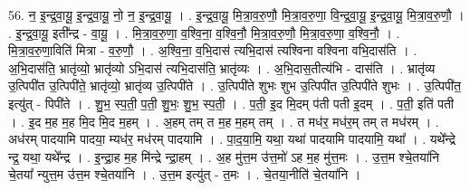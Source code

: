 \documentclass[17pt]{extarticle}
\begin{document}
56. न॒ इ॒न्द्र॒वा॒यू॒ इ॒न्द्र॒वा॒यू॒ नो॒ न॒ इ॒न्द्र॒वा॒यू॒ । . इ॒न्द्र॒वा॒यू॒ मि॒त्रा॒व॒रु॒णौ॒ मि॒त्रा॒व॒रु॒णा॒ वि॒न्द्र॒वा॒॒यू॒ इ॒न्द्र॒वा॒यू॒ मि॒त्रा॒व॒रु॒णौ॒  । . इ॒न्द्र॒वा॒यू॒ इती᳚न्द्र - वा॒यू॒ । . मि॒त्रा॒व॒रु॒णा॒ व॒श्वि॒ना॒ व॒श्वि॒नौ॒ मि॒त्रा॒व॒रु॒णौ॒ मि॒त्रा॒व॒रु॒णा॒ व॒श्वि॒नौ॒ । . मि॒त्रा॒व॒रु॒णा॒विति॑ मित्रा - व॒रु॒णौ॒ । . अ॒श्वि॒ना॒ व॒भि॒दास॑ त्यभि॒दास॑ त्यश्विना वश्विना वभि॒दास॑ति । . अ॒भि॒दास॑ति॒ भ्रातृ॑व्यो॒ भ्रातृ॑व्यो ऽभि॒दास॑ त्यभि॒दास॑ति॒ भ्रातृ॑व्यः । . अ॒भि॒दास॒तीत्य॑भि - दास॑ति । . भ्रातृ॑व्य उ॒त्पिपी॑त उ॒त्पिपी॑ते॒ भ्रातृ॑व्यो॒ भ्रातृ॑व्य उ॒त्पिपी॑ते । . उ॒त्पिपी॑ते शुभः शुभ उ॒त्पिपी॑त उ॒त्पिपी॑ते शुभः । . उ॒त्पिपी॑त॒ इत्यु॑त् - पिपी॑ते । . शु॒भ॒ स्प॒ती॒ प॒ती॒ शु॒भः॒ शु॒भ॒ स्प॒ती॒ । . प॒ती॒ इ॒द मि॒दम् प॑ती पती इ॒दम् । . प॒ती॒ इति॑ पती । . इ॒द म॒ह म॒ह मि॒द मि॒द म॒हम् । . अ॒हम् तम् त म॒ह म॒हम् तम् । . त मध॑र॒ मध॑र॒म् तम् त मध॑रम् । . अध॑रम् पादयामि पादया॒ म्यध॑र॒ मध॑रम् पादयामि । . पा॒द॒या॒मि॒ यथा॒ यथा॑ पादयामि पादयामि॒ यथा᳚ । . यथे᳚न्द्रे न्द्र॒ यथा॒ यथे᳚न्द्र । . इ॒न्द्रा॒ह म॒ह मि॑न्द्रे न्द्रा॒हम् । . अ॒ह मु॑त्त॒म उ॑त्त॒मो॑ ऽह म॒ह मु॑त्त॒मः । . उ॒त्त॒म श्चे॒तया॑नि चे॒तया᳚ न्युत्त॒म उ॑त्त॒म श्चे॒तया॑नि । . उ॒त्त॒म इत्यु॑त् - त॒मः । . चे॒तया॒नीति॑ चे॒तया॑नि । \newline

\end{document}

